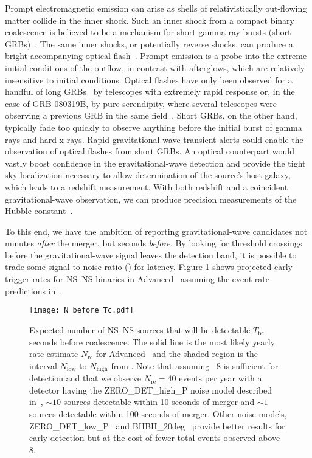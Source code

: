 Prompt electromagnetic emission can arise as shells of relativistically
out-flowing matter collide in the inner shock. Such an inner shock from a
compact binary coalescence is believed to be a mechanism for short gamma-ray
bursts (short GRBs)~\cite{Lee:2005, nakar07}. The same inner shocks, or
potentially reverse shocks, can produce a bright accompanying optical flash~\cite{Sari99}. Prompt emission is a probe into the extreme
initial conditions of the outflow, in contrast with afterglows, which are
relatively insensitive to initial conditions. Optical flashes
have only been observed for a handful of long
GRBs~\cite{1999Natur.398..400A,2003Natur.422..284F,2006A&A...454L.119J,0004-637X-660-1-489,2008Natur.455..183R,2011A&A...528A..15G}
by telescopes with extremely rapid response or, in the case of GRB 080319B, by
pure serendipity, where several telescopes were observing a previous GRB in the
same field~\cite{2008Natur.455..183R}. Short GRBs, on the other hand, typically
fade too quickly to observe anything before the initial burst of gamma rays and hard
x-rays. Rapid gravitational-wave transient alerts could enable the observation
of optical flashes from short GRBs. An optical counterpart would vastly boost
confidence in the gravitational-wave detection and provide the tight sky
localization necessary to allow determination of the source's host galaxy,
which leads to a redshift measurement. With both redshift and a coincident
gravitational-wave observation, we can produce precision measurements of the
Hubble constant~\cite{2010ApJ...725..496N}.

To this end, we have the ambition of reporting gravitational-wave candidates not minutes
\emph{after} the merger, but seconds \emph{before}.  By
looking for threshold crossings before the gravitational-wave signal leaves
the detection band, it is possible to trade some signal to noise ratio (\SNR{})
for latency.  Figure \ref{fig:earlywarning} shows projected early trigger rates
for NS--NS binaries in Advanced \LIGO\ assuming the event rate predictions
in~\cite{Abadie:2010p10836}.
%
\begin{figure}
\texttt{[image: N\_before\_Tc.pdf]}
\caption{\label{fig:earlywarning} Expected number of NS--NS sources that will
be detectable $T_\mathrm{bc}$ seconds before coalescence.  The solid line is the most
likely yearly rate estimate $N_{\mathrm{re}}$ for Advanced \LIGO\ and the
shaded region is the interval $N_{\mathrm{low}}$ to $N_{\mathrm{high}}$ from
\cite{Abadie:2010p10836}.  Note that assuming \SNR\ 8 is sufficient for
detection and that we observe $N_{\mathrm{re}} = 40$ events per year with a
detector having the ZERO\_DET\_high\_P noise model described
in~\cite{ALIGONoiseZERO_DET_high_P}, $\sim10$ sources detectable within 10
seconds of merger and $\sim1$ sources detectable within 100 seconds of
merger.  Other noise models, ZERO\_DET\_low\_P~\cite{ALIGONoiseZERO_DET_low_P}
and BHBH\_20deg~\cite{ALIGONoiseBHBH_20deg} provide better results for early
detection but at the cost of fewer total events observed above \SNR{} 8.}
\end{figure}

